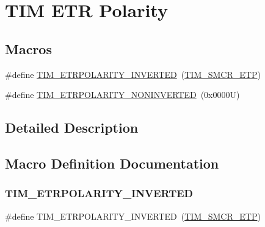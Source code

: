 \hypertarget{group___t_i_m___e_t_r___polarity}{}\section{T\+IM E\+TR Polarity}
\label{group___t_i_m___e_t_r___polarity}
\subsection*{Macros}
\begin{DoxyCompactItemize}
\item 
\#define \hyperlink{group___t_i_m___e_t_r___polarity_ga42652ff688f0042659f8304ae08abfa6}{T\+I\+M\+\_\+\+E\+T\+R\+P\+O\+L\+A\+R\+I\+T\+Y\+\_\+\+I\+N\+V\+E\+R\+T\+ED}~(\hyperlink{group___peripheral___registers___bits___definition_ga2a5f335c3d7a4f82d1e91dc1511e3322}{T\+I\+M\+\_\+\+S\+M\+C\+R\+\_\+\+E\+TP})
\item 
\#define \hyperlink{group___t_i_m___e_t_r___polarity_ga7fa7c43245b25564414b2e191d5d8b14}{T\+I\+M\+\_\+\+E\+T\+R\+P\+O\+L\+A\+R\+I\+T\+Y\+\_\+\+N\+O\+N\+I\+N\+V\+E\+R\+T\+ED}~(0x0000\+U)
\end{DoxyCompactItemize}


\subsection{Detailed Description}


\subsection{Macro Definition Documentation}
\mbox{\label{group___t_i_m___e_t_r___polarity_ga42652ff688f0042659f8304ae08abfa6}} 
\subsubsection{\texorpdfstring{T\+I\+M\+\_\+\+E\+T\+R\+P\+O\+L\+A\+R\+I\+T\+Y\+\_\+\+I\+N\+V\+E\+R\+T\+ED}{TIM\_ETRPOLARITY\_INVERTED}}
{\footnotesize\ttfamily \#define T\+I\+M\+\_\+\+E\+T\+R\+P\+O\+L\+A\+R\+I\+T\+Y\+\_\+\+I\+N\+V\+E\+R\+T\+ED~(\hyperlink{group___peripheral___registers___bits___definition_ga2a5f335c3d7a4f82d1e91dc1511e3322}{T\+I\+M\+\_\+\+S\+M\+C\+R\+\_\+\+E\+TP})}

